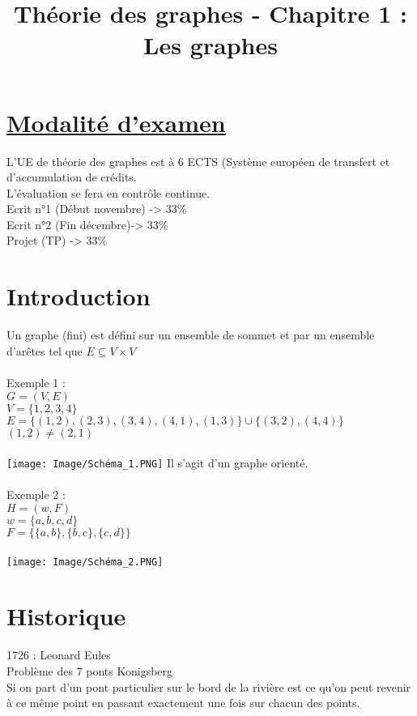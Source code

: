 \documentclass{article}
\title{Théorie des graphes - Chapitre 1 : Les graphes }
\author{}
\date{}
\begin{document}
\maketitle{}
\tableofcontents
\newpage
\section*{{\underline{Modalité d'examen}}}
L'UE de théorie des graphes est à 6 ECTS (Système européen de transfert et d'accumulation de crédits. \\
L'évaluation se fera en contrôle continue. \\
Ecrit n°1 (Début novembre) -> 33\% \\
Ecrit n°2 (Fin décembre)-> 33\% \\
Projet (TP) -> 33\% \\

 

\section{Introduction}
Un graphe (fini) est défini sur un ensemble de sommet et par un ensemble d’arêtes tel que $ E \subseteq V \times V $ \\ \\
Exemple 1 : \\
$ G=(V,E)$ \\
$ V=\{1,2,3,4\} $ \\
$ E=\{(1,2),(2,3),(3,4),(4,1),(1,3)\} \cup \{(3,2),(4,4)\}$ \\ 
$ (1,2) \neq (2,1)$ \\ 
\\
\texttt{[image: Image/Schéma\_1.PNG]}
Il s'agit d'un graphe orienté. \\ 
\\
Exemple 2 : \\
$ H=(w,F) $ \\
$ w=\{a,b,c,d\} $ \\
$ F=\{\{a,b\},\{b,c\},\{c,d\}\} $ \\ 
\\
\texttt{[image: Image/Schéma\_2.PNG]}
\newpage
\section{Historique}
1726 : Leonard Eules \\
Problème des 7 ponts Konigsberg \\
Si on part d’un pont particulier sur le bord de la rivière est ce qu’on peut revenir à ce même point en passant exactement une fois sur chacun des points. \\
\end{document}
